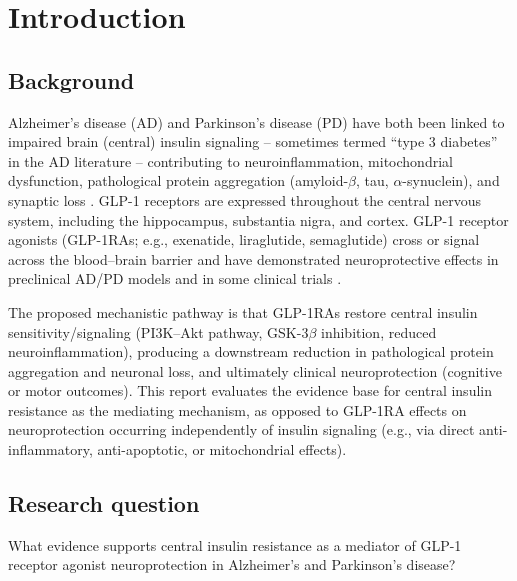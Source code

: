 \documentclass[11pt, a4paper]{article}
\begin{document}
\begin{abstract}
\vspace{0.5em}
\noindent\textbf{Keywords:} GLP-1 receptor agonists; insulin resistance;
Alzheimer's disease; Parkinson's disease; neuroprotection; mediation analysis
\end{abstract}

\section{Introduction}
\label{sec:intro}

\subsection{Background}
Alzheimer's disease (AD) and Parkinson's disease (PD) have both been linked
to impaired brain (central) insulin signaling -- sometimes termed
``type 3 diabetes'' in the AD literature -- contributing to
neuroinflammation, mitochondrial dysfunction, pathological protein
aggregation (amyloid-$\beta$, tau, $\alpha$-synuclein), and synaptic loss
\citep{talbot2014}. GLP-1 receptors are expressed throughout the central
nervous system, including the hippocampus, substantia nigra, and cortex.
GLP-1 receptor agonists (GLP-1RAs; e.g., exenatide, liraglutide,
semaglutide) cross or signal across the blood--brain barrier and have
demonstrated neuroprotective effects in preclinical AD/PD models and in
some clinical trials \citep{hong2024}.

The proposed mechanistic pathway is that GLP-1RAs restore central insulin
sensitivity/signaling (PI3K--Akt pathway, GSK-3$\beta$ inhibition, reduced
neuroinflammation), producing a downstream reduction in pathological protein
aggregation and neuronal loss, and ultimately clinical neuroprotection
(cognitive or motor outcomes). This report evaluates the evidence base for
central insulin resistance as the mediating mechanism, as opposed to GLP-1RA
effects on neuroprotection occurring independently of insulin signaling
(e.g., via direct anti-inflammatory, anti-apoptotic, or mitochondrial
effects).

\subsection{Research question}
What evidence supports central insulin resistance as a mediator of GLP-1
receptor agonist neuroprotection in Alzheimer's and Parkinson's disease?
\end{document}
